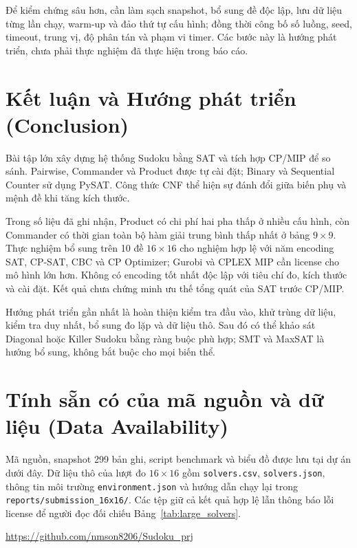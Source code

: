\documentclass[a4paper,fleqn,nologo]{cas-sc}
\begin{document}
Để kiểm chứng sâu hơn, cần làm sạch snapshot, bổ sung đề độc lập, lưu dữ liệu từng lần chạy, warm-up và đảo thứ tự cấu hình; đồng thời công bố số luồng, seed, timeout, trung vị, độ phân tán và phạm vi timer. Các bước này là hướng phát triển, chưa phải thực nghiệm đã thực hiện trong báo cáo.

\section{Kết luận và Hướng phát triển (Conclusion)}
Bài tập lớn xây dựng hệ thống Sudoku bằng SAT và tích hợp CP/MIP để so sánh. Pairwise, Commander và Product được tự cài đặt; Binary và Sequential Counter sử dụng PySAT. Công thức CNF thể hiện sự đánh đổi giữa biến phụ và mệnh đề khi tăng kích thước.

Trong số liệu đã ghi nhận, Product có chi phí hai pha thấp ở nhiều cấu hình, còn Commander có thời gian toàn bộ hàm giải trung bình thấp nhất ở bảng $9\times9$. Thực nghiệm bổ sung trên 10 đề $16\times16$ cho nghiệm hợp lệ với năm encoding SAT, CP-SAT, CBC và CP Optimizer; Gurobi và CPLEX MIP cần license cho mô hình lớn hơn. Không có encoding tốt nhất độc lập với tiêu chí đo, kích thước và cài đặt. Kết quả chưa chứng minh ưu thế tổng quát của SAT trước CP/MIP.

Hướng phát triển gần nhất là hoàn thiện kiểm tra đầu vào, khử trùng dữ liệu, kiểm tra duy nhất, bổ sung đo lặp và dữ liệu thô. Sau đó có thể khảo sát Diagonal hoặc Killer Sudoku bằng ràng buộc phù hợp; SMT và MaxSAT là hướng bổ sung, không bắt buộc cho mọi biến thể.

\section*{Tính sẵn có của mã nguồn và dữ liệu (Data Availability)}
Mã nguồn, snapshot 299 bản ghi, script benchmark và biểu đồ được lưu tại dự án dưới đây. Dữ liệu thô của lượt đo $16\times16$ gồm \texttt{solvers.csv}, \texttt{solvers.json}, thông tin môi trường \texttt{environment.json} và hướng dẫn chạy lại trong \texttt{reports/submission\_16x16/}. Các tệp giữ cả kết quả hợp lệ lẫn thông báo lỗi license để người đọc đối chiếu Bảng~\ref{tab:large_solvers}.
\begin{center}
\url{https://github.com/nmson8206/Sudoku_prj}
\end{center}

\FloatBarrier


\end{document}
